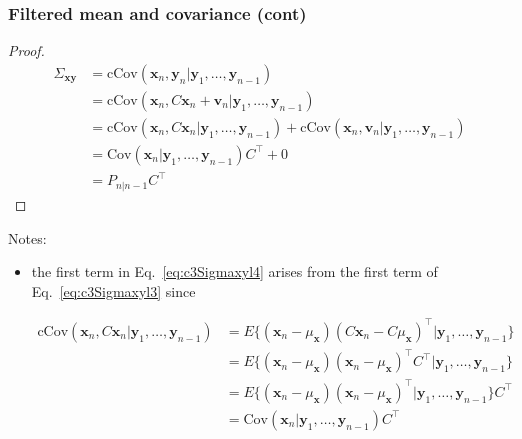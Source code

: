 \begin{frame}
    \frametitle{Filtered mean and covariance (cont)}
    \scriptsize

    \begin{proof}\renewcommand{\qedsymbol}{}
    \begin{align}
        \Sigma_{\mathbf{x}\mathbf{y}}&=\text{cCov}(\mathbf{x}_n,\mathbf{y}_n|\mathbf{y}_1,\ldots,\mathbf{y}_{n-1})\nonumber\\
                                     &=\text{cCov}(\mathbf{x}_n,C\mathbf{x}_n+\mathbf{v}_n|\mathbf{y}_1,\ldots,\mathbf{y}_{n-1})\nonumber\\
                                     &=\text{cCov}(\mathbf{x}_n,C\mathbf{x}_n|\mathbf{y}_1,\ldots,\mathbf{y}_{n-1})+\text{cCov}(\mathbf{x}_n,\mathbf{v}_n|\mathbf{y}_1,\ldots,\mathbf{y}_{n-1})\label{eq:c3Sigmaxyl3}\\
                                     &=\text{Cov}(\mathbf{x}_n|\mathbf{y}_1,\ldots,\mathbf{y}_{n-1})C^\intercal+0\label{eq:c3Sigmaxyl4}\\
                                     &=P_{n|n-1}C^\intercal\label{eq:sigmaxy}
    \end{align}
    \end{proof}

    Notes:

    \begin{itemize}
        \item the first term in Eq.~\ref{eq:c3Sigmaxyl4} arises from the first
            term of Eq.~\ref{eq:c3Sigmaxyl3} since

            \begin{align*}
                \text{cCov}(\mathbf{x}_n,C\mathbf{x}_n|\mathbf{y}_1,\ldots,\mathbf{y}_{n-1})&=E\{(\mathbf{x}_n-\mu_\mathbf{x})(C\mathbf{x}_n-C\mu_{\mathbf{x}})^\intercal|\mathbf{y}_1,\ldots,\mathbf{y}_{n-1}\}\\
                                                                                            &=E\{(\mathbf{x}_n-\mu_\mathbf{x})(\mathbf{x}_n-\mu_{\mathbf{x}})^\intercal C^\intercal|\mathbf{y}_1,\ldots,\mathbf{y}_{n-1}\}\\
                                                                                            &=E\{(\mathbf{x}_n-\mu_\mathbf{x})(\mathbf{x}_n-\mu_{\mathbf{x}})^\intercal|\mathbf{y}_1,\ldots,\mathbf{y}_{n-1}\}C^\intercal\\
                                                                                            &=\text{Cov}(\mathbf{x}_n|\mathbf{y}_1,\ldots,\mathbf{y}_{n-1})C^\intercal
            \end{align*}

    \end{itemize}
\end{frame}


